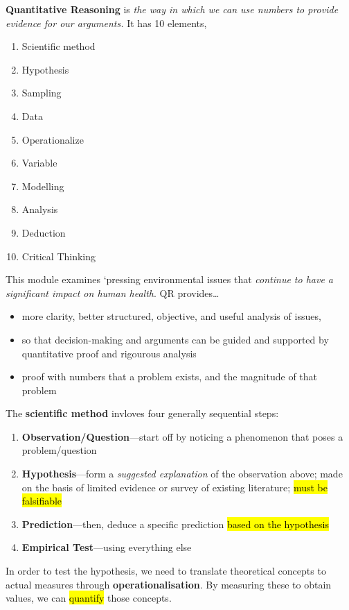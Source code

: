 \documentclass{article}
\newcommand{\headingsmall}[1]{{\small\textbf{#1}}}
\begin{document}
\begin{multicols*}{4}
\headingsmall{Quantitative Reasoning} is \textit{
    the way in which we can use numbers to provide evidence for our 
    arguments.
} It has 10 elements,
\begin{enumerate} \itemsep -0.5em
    \item Scientific method
    \item Hypothesis
    \item Sampling
    \item Data
    \item Operationalize
    \item Variable
    \item Modelling
    \item Analysis
    \item Deduction
    \item Critical Thinking
\end{enumerate}
This module examines `pressing environmental issues that
\textit{continue to have a significant impact on human health}. QR
provides\dots
\begin{itemize} \itemsep -0.5em
    \item more clarity, better structured, objective, and useful 
        analysis of issues, 
    \item so that decision-making and arguments can be guided and
        supported by quantitative proof and rigourous analysis
    \item proof with numbers that a problem exists, and the magnitude
        of that problem
\end{itemize}

The \headingsmall{scientific method} invloves four generally 
sequential steps:
\begin{enumerate} \itemsep -0.5em
    \item \textbf{Observation/Question}---start off by noticing a phenomenon
        that poses a problem/question
    \item \textbf{Hypothesis}---form a \textit{suggested explanation} of the
        observation above; made on the basis of limited evidence or
        survey of existing literature; \hl{must be falsifiable}
    \item \textbf{Prediction}---then, deduce a specific prediction
        \hl{based on the hypothesis}
    \item \textbf{Empirical Test}---using everything else
\end{enumerate}

In order to test the hypothesis, we need to translate theoretical
concepts to actual measures through \headingsmall{operationalisation}.
By measuring these to obtain values, we can \hl{quantify} those concepts. \\


\end{multicols*}
\end{document}
